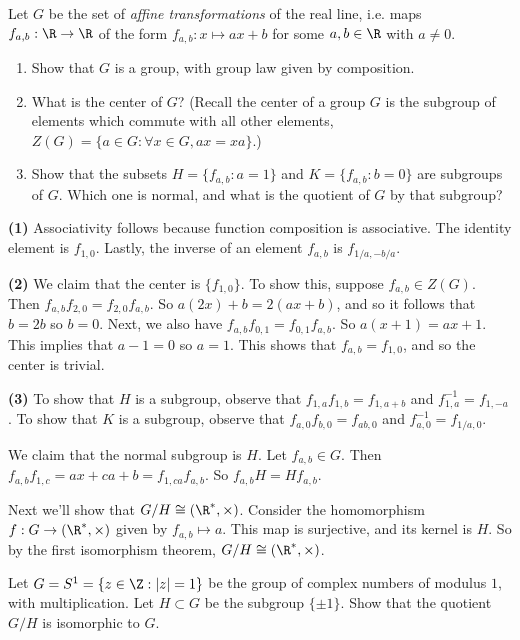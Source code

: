 \documentclass[11pt,letterpaper]{article}
\begin{document}
\pagebreak
\begin{problem}
  Let $G$ be the set of {\em affine transformations} of the real line, i.e. maps $f_{a,b} : \R \to \R$ of the form $f_{a,b} : x \mapsto ax + b$ for some $a,b\in \R$ with $a\neq 0$.
  \begin{enumerate}
    \item Show that $G$ is a group, with group law given by composition.
    \item What is the center of $G$? (Recall the center of a group $G$ is the subgroup of elements which commute with all other elements, $Z(G)=\{a\in G : \forall x\in G, ax=xa\}$.)
    \item Show that the subsets $H=\{ f_{a,b} : a=1\}$ and $K=\{f_{a,b} : b=0\}$ are subgroups of $G$. Which one is normal, and what is the quotient of $G$ by that subgroup?  
  \end{enumerate}
\end{problem}

\textbf{(1)} Associativity follows because function composition is associative. The identity element is $f_{1,0}$. Lastly, the inverse of an element $f_{a,b}$ is $f_{1 /a, -b /a}$.

\textbf{(2)} We claim that the center is $\{ f_{1,0} \}$. To show this, suppose $f_{a,b}\in Z(G)$. Then $f_{a,b}f_{2,0}=f_{2,0}f_{a,b}$. So $a(2x)+b=2(ax+b)$, and so it follows that $b=2b$ so $b=0$. Next, we also have $f_{a,b}f_{0,1}=f_{0,1}f_{a,b}$. So $a(x+1)=ax+1$. This implies that $a-1=0$ so $a=1$. This shows that $f_{a,b}=f_{1,0}$, and so the center is trivial.

\textbf{(3)} To show that $H$ is a subgroup, observe that $f_{1,a}f_{1,b}=f_{1,a+b}$ and $f^{-1}_{1,a}=f_{1,-a}$. To show that $K$ is a subgroup, observe that $f_{a,0}f_{b,0}=f_{ab,0}$ and $f^{-1}_{a,0}=f_{1 /a, 0}$.    

We claim that the normal subgroup is $H$. Let $f_{a,b}\in G$. Then $f_{a,b}f_{1,c}=ax+ca+b=f_{1,ca}f_{a,b}$. So $f_{a,b}H=Hf_{a,b}$. 

Next we'll show that $G /H \cong (\R^*, \times)$. Consider the homomorphism $f : G \to (\R^*, \times)$ given by $f_{a,b} \mapsto a$. This map is surjective, and its kernel is $H$. So by the first isomorphism theorem, $G /H \cong (\R^*, \times)$.   

\pagebreak
\begin{problem}
  Let $G=S^1=\{ z\in \Z : |z|=1\}$ be the group of complex numbers of modulus $1$, with multiplication. Let $H\subset G$ be the subgroup $\{\pm 1\}$. Show that the quotient $G /H$ is isomorphic to $G$.   
\end{problem}
\end{document}
